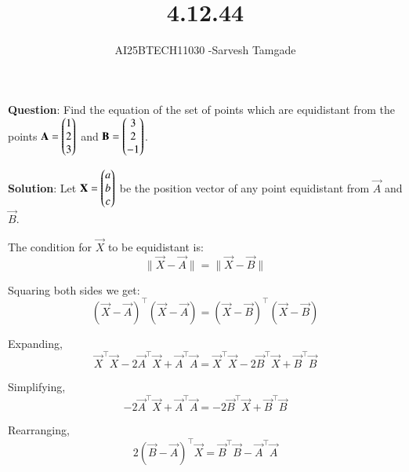 \documentclass[journal]{IEEEtran}
\begin{document}

\vspace{3cm}

\title{4.12.44}
\author{AI25BTECH11030 -Sarvesh Tamgade}
{\let\newpage\relax\maketitle}

\renewcommand{\thefigure}{\theenumi}
\renewcommand{\thetable}{\theenumi}
\setlength{\intextsep}{10pt} 


\renewcommand{\thetable}{\theenumi}


\textbf{Question}: Find the equation of the set of points which are equidistant from the points \(\mathbf{A} = \begin{pmatrix}1 \\ 2 \\ 3\end{pmatrix}\) and \(\mathbf{B} = \begin{pmatrix}3 \\ 2 \\ -1\end{pmatrix}\).

\textbf{Solution}:
Let \(\mathbf{X} = \begin{pmatrix}a \\ b \\ c\end{pmatrix}\) be the position vector of any point equidistant from \(\vec{A}\) and \(\vec{B}\).

The condition for \(\vec{X}\) to be equidistant is:
\begin{equation}
\|\vec{X} - \vec{A}\| = \|\vec{X} - \vec{B}\|
\end{equation}

Squaring both sides we get:
\begin{equation}
(\vec{X} - \vec{A})^\top (\vec{X} - \vec{A}) = (\vec{X} - \vec{B})^\top (\vec{X} - \vec{B})
\end{equation}

Expanding,
\begin{equation}
\vec{X}^\top \vec{X} - 2 \vec{A}^\top \vec{X} + \vec{A}^\top \vec{A} = \vec{X}^\top \vec{X} - 2 \vec{B}^\top \vec{X} + \vec{B}^\top \vec{B}
\end{equation}

Simplifying,
\begin{equation}
-2 \vec{A}^\top \vec{X} + \vec{A}^\top \vec{A} = -2 \vec{B}^\top \vec{X} + \vec{B}^\top \vec{B}
\end{equation}

Rearranging,
\begin{equation}
2(\vec{B} - \vec{A})^\top \vec{X} = \vec{B}^\top \vec{B} - \vec{A}^\top \vec{A}
\end{equation}
\end{document}
